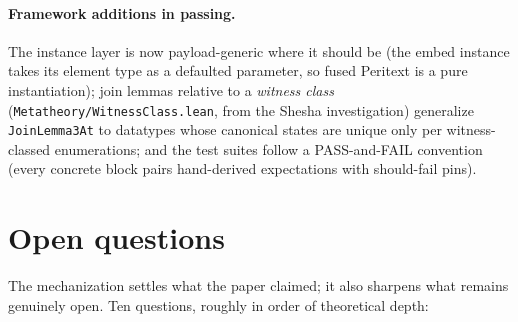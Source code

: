 \documentclass[11pt]{article}
\newcommand{\lean}[1]{\texttt{#1}}
\begin{document}
\paragraph{Framework additions in passing.} The instance layer is now
payload-generic where it should be (the embed instance takes its element
type as a defaulted parameter, so fused Peritext is a pure
instantiation); join lemmas relative to a \emph{witness class}
(\lean{Metatheory/WitnessClass.lean}, from the Shesha investigation)
generalize \lean{JoinLemma3At} to datatypes whose canonical states are
unique only per witness-classed enumerations; and the test suites follow
a PASS-and-FAIL convention (every concrete block pairs hand-derived
expectations with should-fail pins).

\section{Open questions}
\label{sec:open}

The mechanization settles what the paper claimed; it also sharpens what
remains genuinely open. Ten questions, roughly in order of theoretical
depth:
\end{document}
